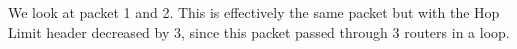 We look at packet 1 and 2. This is effectively the same packet but with the Hop Limit header decreased by 3, since this packet passed through 3 routers in a loop.